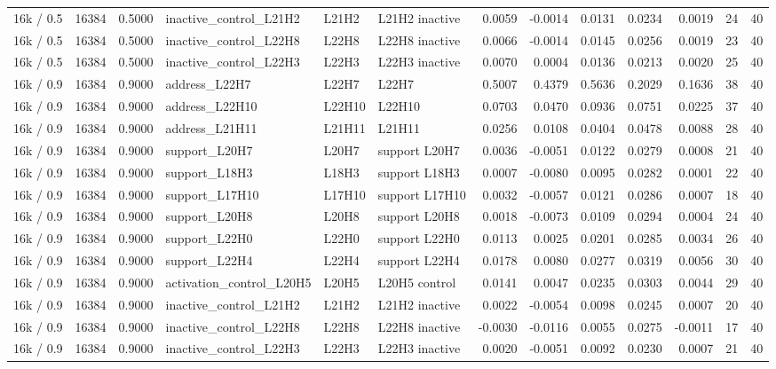 \begin{tabular}{lrrlllrrrrrrr}
16k / 0.5 & 16384 & 0.5000 & inactive_control_L21H2 & L21H2 & L21H2 inactive & 0.0059 & -0.0014 & 0.0131 & 0.0234 & 0.0019 & 24 & 40 \\
16k / 0.5 & 16384 & 0.5000 & inactive_control_L22H8 & L22H8 & L22H8 inactive & 0.0066 & -0.0014 & 0.0145 & 0.0256 & 0.0019 & 23 & 40 \\
16k / 0.5 & 16384 & 0.5000 & inactive_control_L22H3 & L22H3 & L22H3 inactive & 0.0070 & 0.0004 & 0.0136 & 0.0213 & 0.0020 & 25 & 40 \\
16k / 0.9 & 16384 & 0.9000 & address_L22H7 & L22H7 & L22H7 & 0.5007 & 0.4379 & 0.5636 & 0.2029 & 0.1636 & 38 & 40 \\
16k / 0.9 & 16384 & 0.9000 & address_L22H10 & L22H10 & L22H10 & 0.0703 & 0.0470 & 0.0936 & 0.0751 & 0.0225 & 37 & 40 \\
16k / 0.9 & 16384 & 0.9000 & address_L21H11 & L21H11 & L21H11 & 0.0256 & 0.0108 & 0.0404 & 0.0478 & 0.0088 & 28 & 40 \\
16k / 0.9 & 16384 & 0.9000 & support_L20H7 & L20H7 & support L20H7 & 0.0036 & -0.0051 & 0.0122 & 0.0279 & 0.0008 & 21 & 40 \\
16k / 0.9 & 16384 & 0.9000 & support_L18H3 & L18H3 & support L18H3 & 0.0007 & -0.0080 & 0.0095 & 0.0282 & 0.0001 & 22 & 40 \\
16k / 0.9 & 16384 & 0.9000 & support_L17H10 & L17H10 & support L17H10 & 0.0032 & -0.0057 & 0.0121 & 0.0286 & 0.0007 & 18 & 40 \\
16k / 0.9 & 16384 & 0.9000 & support_L20H8 & L20H8 & support L20H8 & 0.0018 & -0.0073 & 0.0109 & 0.0294 & 0.0004 & 24 & 40 \\
16k / 0.9 & 16384 & 0.9000 & support_L22H0 & L22H0 & support L22H0 & 0.0113 & 0.0025 & 0.0201 & 0.0285 & 0.0034 & 26 & 40 \\
16k / 0.9 & 16384 & 0.9000 & support_L22H4 & L22H4 & support L22H4 & 0.0178 & 0.0080 & 0.0277 & 0.0319 & 0.0056 & 30 & 40 \\
16k / 0.9 & 16384 & 0.9000 & activation_control_L20H5 & L20H5 & L20H5 control & 0.0141 & 0.0047 & 0.0235 & 0.0303 & 0.0044 & 29 & 40 \\
16k / 0.9 & 16384 & 0.9000 & inactive_control_L21H2 & L21H2 & L21H2 inactive & 0.0022 & -0.0054 & 0.0098 & 0.0245 & 0.0007 & 20 & 40 \\
16k / 0.9 & 16384 & 0.9000 & inactive_control_L22H8 & L22H8 & L22H8 inactive & -0.0030 & -0.0116 & 0.0055 & 0.0275 & -0.0011 & 17 & 40 \\
16k / 0.9 & 16384 & 0.9000 & inactive_control_L22H3 & L22H3 & L22H3 inactive & 0.0020 & -0.0051 & 0.0092 & 0.0230 & 0.0007 & 21 & 40 \\
\bottomrule
\end{tabular}
